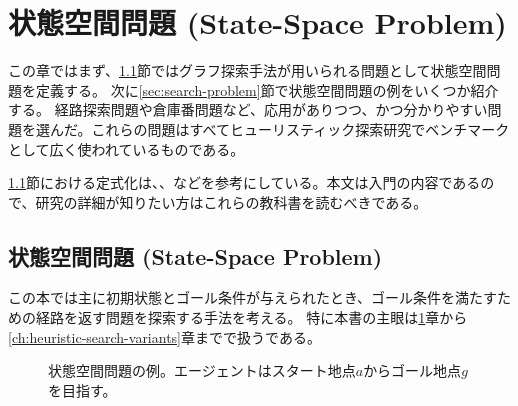 
\chapter{状態空間問題 (State-Space Problem)}
\label{ch:state-space-problem}

この章ではまず、\ref{sec:state-space-problem}節ではグラフ探索手法が用いられる問題として状態空間問題を定義する。
次に\ref{sec:search-problem}節で状態空間問題の例をいくつか紹介する。
経路探索問題や倉庫番問題など、応用がありつつ、かつ分かりやすい問題を選んだ。これらの問題はすべてヒューリスティック探索研究でベンチマークとして広く使われているものである。

\ref{sec:state-space-problem}節における定式化は\cite{russelln03}、\cite{pearl84}、\cite{edelkamp:2010:hst:1875144}などを参考にしている。本文は入門の内容であるので、研究の詳細が知りたい方はこれらの教科書を読むべきである。


\section{状態空間問題 (State-Space Problem)}
\label{sec:state-space-problem}

この本では主に初期状態とゴール条件が与えられたとき、ゴール条件を満たすための経路を返す問題を探索する手法を考える。
特に本書の主眼は\ref{ch:state-space-problem}章から\ref{ch:heuristic-search-variants}章までで扱うである。



\begin{figure}[htb]
  \centering
  \begin{tikzpicture}[scale=0.5]
    
  \end{tikzpicture}
  \caption{状態空間問題の例。エージェントはスタート地点$a$からゴール地点$g$を目指す。
  }
  \label{fig:ssp-graph}
\end{figure}


